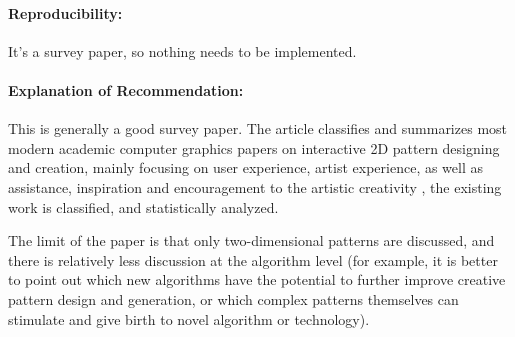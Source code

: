 \documentclass{egpubl}
\newcommand{\rev}[2]{{\color{greenrev}\textsuperscript{#1}#2}}
\renewcommand{\rev}[2]{{#2}}
\begin{document}
\paragraph*{Reproducibility:} It's a survey paper, so nothing needs to be implemented.
\paragraph*{Explanation of Recommendation:} This is generally a good survey paper. The article classifies and summarizes most modern academic computer graphics papers on interactive 2D pattern designing and creation, mainly focusing on user experience, artist experience, as well as assistance, inspiration and encouragement  to the artistic creativity , the existing work is classified, and statistically analyzed.

The limit of the paper is that only two-dimensional patterns are discussed, and there is relatively less discussion at the algorithm level (for example, it is better to point out which new algorithms have the potential to further improve creative pattern design and generation, or which complex patterns themselves can stimulate and give birth to novel  algorithm or  technology).

\rev{Comments}{}



%  
%        




\printbibliography
\end{document}
